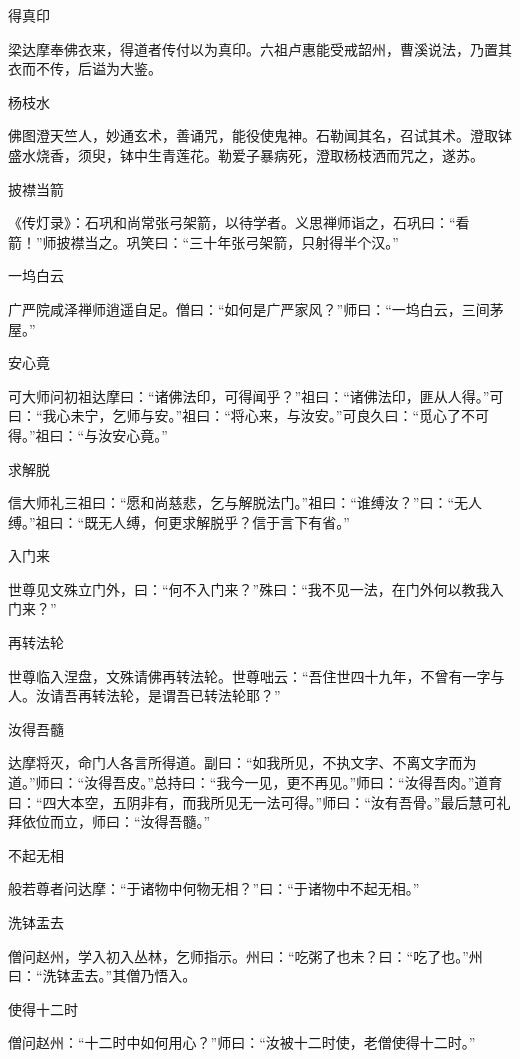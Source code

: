 \documentclass[a4paper,12pt,UTF8,twoside]{ctexbook}
\begin{document}
    得真印
    
    梁达摩奉佛衣来，得道者传付以为真印。六祖卢惠能受戒韶州，曹溪说法，乃置其衣而不传，后谥为大鉴。
    
    杨枝水
    
    佛图澄天竺人，妙通玄术，善诵咒，能役使鬼神。石勒闻其名，召试其术。澄取钵盛水烧香，须臾，钵中生青莲花。勒爱子暴病死，澄取杨枝洒而咒之，遂苏。
    
    披襟当箭
    
    《传灯录》：石巩和尚常张弓架箭，以待学者。义思禅师诣之，石巩曰：“看箭！”师披襟当之。巩笑曰：“三十年张弓架箭，只射得半个汉。”
    
    一坞白云
    
    广严院咸泽禅师逍遥自足。僧曰：“如何是广严家风？”师曰：“一坞白云，三间茅屋。”
    
    安心竟
    
    可大师问初祖达摩曰：“诸佛法印，可得闻乎？”祖曰：“诸佛法印，匪从人得。”可曰：“我心未宁，乞师与安。”祖曰：“将心来，与汝安。”可良久曰：“觅心了不可得。”祖曰：“与汝安心竟。”
    
    求解脱
    
    信大师礼三祖曰：“愿和尚慈悲，乞与解脱法门。”祖曰：“谁缚汝？”曰：“无人缚。”祖曰：“既无人缚，何更求解脱乎？信于言下有省。”
    
    入门来
    
    世尊见文殊立门外，曰：“何不入门来？”殊曰：“我不见一法，在门外何以教我入门来？”
    
    再转法轮
    
    世尊临入涅盘，文殊请佛再转法轮。世尊咄云：“吾住世四十九年，不曾有一字与人。汝请吾再转法轮，是谓吾已转法轮耶？”
    
    汝得吾髓
    
    达摩将灭，命门人各言所得道。副曰：“如我所见，不执文字、不离文字而为道。”师曰：“汝得吾皮。”总持曰：“我今一见，更不再见。”师曰：“汝得吾肉。”道育曰：“四大本空，五阴非有，而我所见无一法可得。”师曰：“汝有吾骨。”最后慧可礼拜依位而立，师曰：“汝得吾髓。”
    
    不起无相
    
    般若尊者问达摩：“于诸物中何物无相？”曰：“于诸物中不起无相。”
    
    洗钵盂去
    
    僧问赵州，学入初入丛林，乞师指示。州曰：“吃粥了也未？曰：“吃了也。”州曰：“洗钵盂去。”其僧乃悟入。
    
    使得十二时
    
    僧问赵州：“十二时中如何用心？”师曰：“汝被十二时使，老僧使得十二时。”
    
\end{document}
